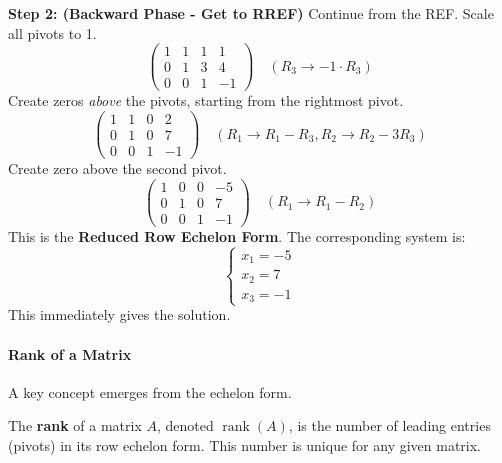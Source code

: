 \textbf{Step 2: (Backward Phase - Get to RREF)}
Continue from the REF. Scale all pivots to 1.
\[
\left(\begin{array}{ccc|c}
1 & 1 & 1 & 1 \\
0 & 1 & 3 & 4 \\
0 & 0 & 1 & -1
\end{array}\right) \quad (R_3 \to -1 \cdot R_3)
\]
Create zeros \emph{above} the pivots, starting from the rightmost pivot.
\[
\left(\begin{array}{ccc|c}
1 & 1 & 0 & 2 \\
0 & 1 & 0 & 7 \\
0 & 0 & 1 & -1
\end{array}\right) \quad (R_1 \to R_1 - R_3, R_2 \to R_2 - 3R_3)
\]
Create zero above the second pivot.
\[
\left(\begin{array}{ccc|c}
1 & 0 & 0 & -5 \\
0 & 1 & 0 & 7 \\
0 & 0 & 1 & -1
\end{array}\right) \quad (R_1 \to R_1 - R_2)
\]
This is the \textbf{Reduced Row Echelon Form}. The corresponding system is:
\[
\begin{cases}
x_1 = -5 \\
x_2 = 7 \\
x_3 = -1
\end{cases}
\]
This immediately gives the solution.



\paragraph{Rank of a Matrix}
A key concept emerges from the echelon form.

\begin{definition}
The \textbf{rank} of a matrix $A$, denoted $\operatorname{rank}(A)$, is the number of leading entries (pivots) in its row echelon form. This number is unique for any given matrix.
\end{definition}

